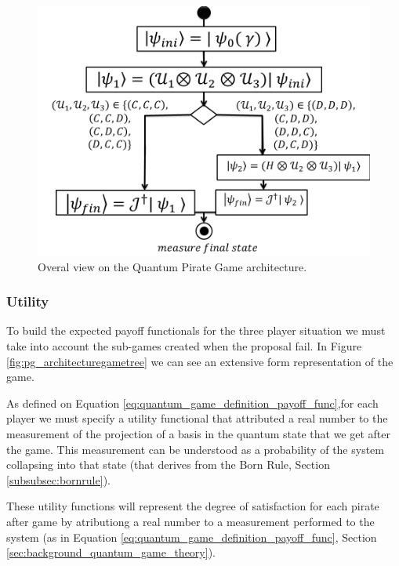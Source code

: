 \begin{figure}[h]
\centering 
\includegraphics[scale=0.55]{Figures/architecture/esquema/Slide5.png}
\caption{Overal view on the Quantum Pirate Game architecture. }
\label{fig:pg_architecture3players_architecture}
\end{figure}

\subsubsection{Utility}
\label{subsec:pirates_utility}

To build the expected payoff functionals for the three player situation we must take into account the sub-games created when the proposal fail. In Figure \ref{fig:pg_architecturegametree} we can see an extensive form representation of the game.



As defined on Equation \ref{eq:quantum_game_definition_payoff_func},for each player we must specify a utility functional that attributed a real number to the measurement of the projection of a basis in the quantum state that we get after the game. This measurement can be understood as a probability of the system collapsing into that state (that derives from the Born Rule, Section \ref{subsubsec:bornrule}).


These utility functions will represent the degree of satisfaction for each pirate after game by atributiong a real number to a measurement performed to the system (as in Equation \ref{eq:quantum_game_definition_payoff_func}, Section \ref{sec:background_quantum_game_theory}). 


